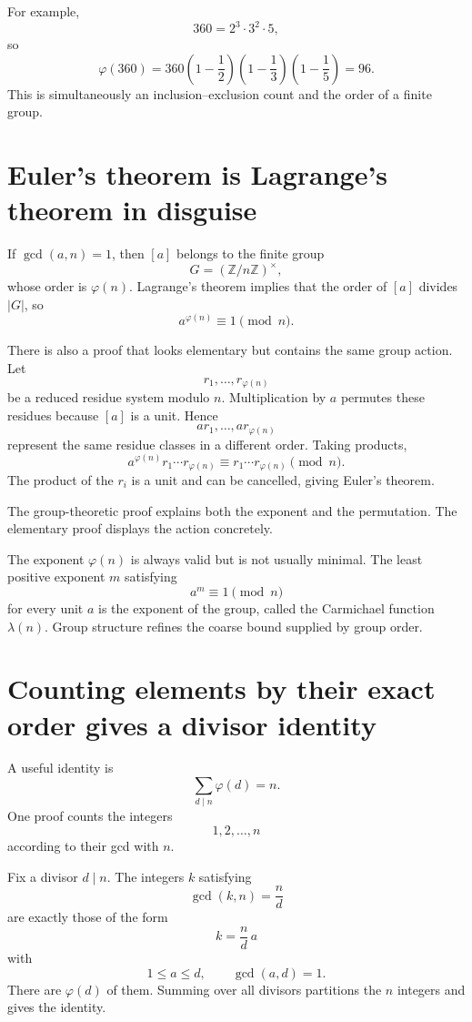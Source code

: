 For example,
\[
  360=2^3\cdot3^2\cdot5,
\]
so
\[
  \varphi(360)
  =360\left(1-\frac12\right)
       \left(1-\frac13\right)
       \left(1-\frac15\right)
  =96.
\]
This is simultaneously an inclusion--exclusion count and the order of a finite group.

\section{Euler's theorem is Lagrange's theorem in disguise}

If \(\gcd(a,n)=1\), then \([a]\) belongs to the finite group
\[
  G=(\mathbb Z/n\mathbb Z)^\times,
\]
whose order is \(\varphi(n)\).  Lagrange's theorem implies that the order of \([a]\) divides \(|G|\), so
\[
  \boxed{
  a^{\varphi(n)}\equiv1\pmod n.}
\]

There is also a proof that looks elementary but contains the same group action.  Let
\[
  r_1,\ldots,r_{\varphi(n)}
\]
be a reduced residue system modulo \(n\).  Multiplication by \(a\) permutes these residues because \([a]\) is a unit.  Hence
\[
  ar_1,\ldots,ar_{\varphi(n)}
\]
represent the same residue classes in a different order.  Taking products,
\[
  a^{\varphi(n)}r_1\cdots r_{\varphi(n)}
  \equiv
  r_1\cdots r_{\varphi(n)}\pmod n.
\]
The product of the \(r_i\) is a unit and can be cancelled, giving Euler's theorem.

The group-theoretic proof explains both the exponent and the permutation.  The elementary proof displays the action concretely.

The exponent \(\varphi(n)\) is always valid but is not usually minimal.  The least positive exponent \(m\) satisfying
\[
  a^m\equiv1\pmod n
\]
for every unit \(a\) is the exponent of the group, called the Carmichael function \(\lambda(n)\).  Group structure refines the coarse bound supplied by group order.

\section{Counting elements by their exact order gives a divisor identity}

A useful identity is
\[
  \boxed{
  \sum_{d\mid n}\varphi(d)=n.}
\]
One proof counts the integers
\[
  1,2,\ldots,n
\]
according to their gcd with \(n\).

Fix a divisor \(d\mid n\).  The integers \(k\) satisfying
\[
  \gcd(k,n)=\frac nd
\]
are exactly those of the form
\[
  k=\frac nd\,a
\]
with
\[
  1\le a\le d,
  \qquad
  \gcd(a,d)=1.
\]
There are \(\varphi(d)\) of them.  Summing over all divisors partitions the \(n\) integers and gives the identity.

